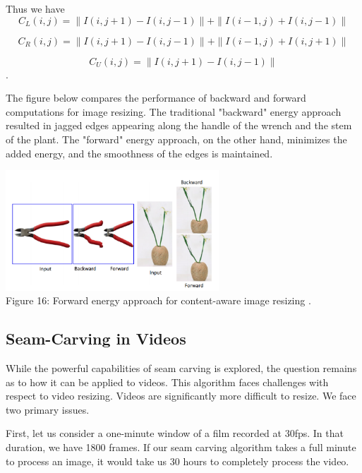 \documentclass{article}
\begin{document}
Thus we have 
$$C_L(i,j) = \|I(i,j+1) - I(i,j-1)\| + \|I(i-1,j) + I(i, j-1) \|$$

$$C_R(i,j) = \|I(i,j+1) - I(i,j-1)\| + \|I(i-1,j) + I(i, j+1) \|$$

$$C_U(i,j) = \|I(i,j+1) - I(i,j-1)\|$$.

The figure below compares the performance of backward and forward computations for image resizing. The traditional "backward" energy approach resulted in jagged edges appearing along the handle of the wrench and the stem of the plant. The "forward" energy approach, on the other hand, minimizes the added energy, and the smoothness of the edges is maintained.

\begin{center}
\includegraphics[width=8cm]{forward_energy.PNG} \\
Figure 16: Forward energy approach for content-aware image resizing \cite{avidan2007seam}.
\end{center}

\subsection{Seam-Carving in Videos}
While the powerful capabilities of seam carving is explored, the question remains as to how it can be applied to videos. This algorithm faces challenges with respect to video resizing. Videos are significantly more difficult to resize. We face two primary issues.

First, let us consider a one-minute window of a film recorded at 30fps. In that duration, we have 1800 frames. If our seam carving algorithm takes a full minute to process an image, it would take us 30 hours to completely process the video.
\end{document}
